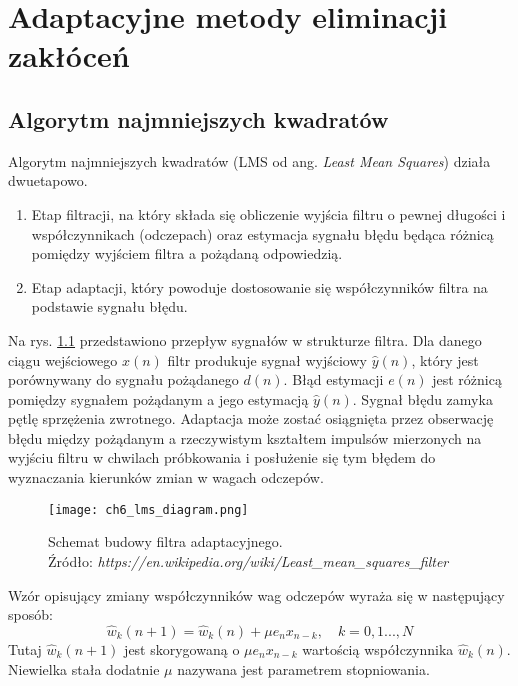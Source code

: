\chapter{Adaptacyjne metody eliminacji zakłóceń}
\section{Algorytm najmniejszych kwadratów}
Algorytm najmniejszych kwadratów (LMS od ang. \textit{Least Mean Squares}) działa dwuetapowo.
\begin{enumerate}
\item Etap filtracji, na który składa się obliczenie wyjścia filtru o pewnej długości i współczynnikach (odczepach) oraz estymacja sygnału błędu będąca różnicą pomiędzy wyjściem filtra a pożądaną odpowiedzią.
\item Etap adaptacji, który powoduje dostosowanie się współczynników filtra na podstawie sygnału błędu.
\end{enumerate}
Na rys. \ref{lms_filter} przedstawiono przepływ sygnałów w strukturze filtra. 
Dla danego ciągu wejściowego $x(n)$ filtr produkuje sygnał wyjściowy $\hat{y}(n)$, który jest porównywany do sygnału pożądanego $d(n)$. 
Błąd estymacji $e(n)$ jest różnicą pomiędzy sygnałem pożądanym a jego estymacją $\hat{y}(n)$. 
Sygnał błędu zamyka pętlę sprzężenia zwrotnego. \cite{Haykin:1996:AFT:230061} 
Adaptacja może zostać osiągnięta przez obserwację błędu między pożądanym a rzeczywistym kształtem impulsów mierzonych na wyjściu filtru w chwilach próbkowania i posłużenie się tym błędem do wyznaczania kierunków zmian w wagach odczepów. \cite{Haykin:1998:ST}

\begin{figure}[ht]
\centering
\texttt{[image: ch6\_lms\_diagram.png]}
\caption[Schemat budowy filtra adaptacyjnego.; Źródło: \textit{https://en.wikipedia.org/wiki/Least_mean_squares_filter}]{Schemat budowy filtra adaptacyjnego. \\ Źródło: \textit{https://en.wikipedia.org/wiki/Least\_mean\_squares\_filter}\endtabular}
\label{lms_filter}
\end{figure}

Wzór opisujący zmiany współczynników wag odczepów wyraża się w następujący sposób:
\begin{equation}
\hat{w}_k(n+1) = \hat{w}_k(n) + \mu e_nx_{n-k}, \quad k= 0,1...,N
\end{equation}
Tutaj $\hat{w}_k(n+1)$ jest skorygowaną o $\mu e_nx_{n-k}$ wartością współczynnika $\hat{w}_k(n)$. 
Niewielka stała dodatnie $\mu$ nazywana jest parametrem stopniowania. \cite{Haykin:1998:ST} 


